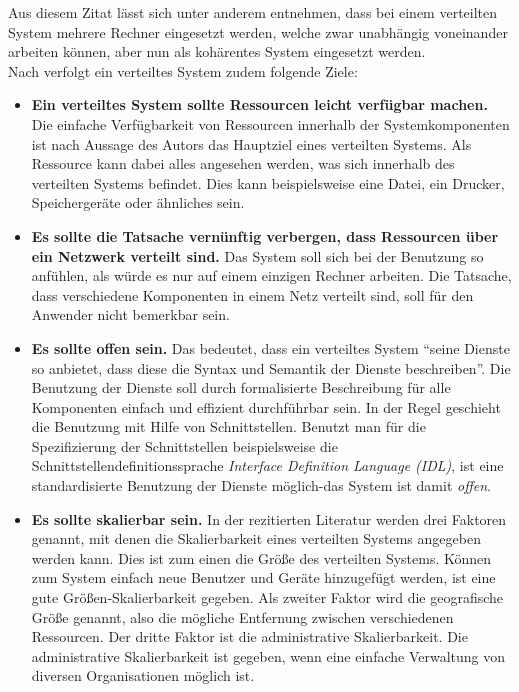 Aus diesem Zitat lässt sich unter anderem entnehmen, dass bei einem verteilten System mehrere Rechner eingesetzt werden, welche zwar unabhängig voneinander arbeiten können, aber nun als kohärentes System eingesetzt werden. \\
Nach \citep{tanenbaum} verfolgt ein verteiltes System zudem folgende Ziele: 
\begin{itemize}
	\item \textbf{Ein verteiltes System sollte Ressourcen leicht verfügbar machen.}
	Die einfache Verfügbarkeit von Ressourcen innerhalb der Systemkomponenten ist nach Aussage des Autors das Hauptziel eines verteilten Systems. Als Ressource kann dabei alles angesehen werden, was sich innerhalb des verteilten Systems befindet. Dies kann beispielsweise eine Datei, ein Drucker, Speichergeräte oder ähnliches sein. 
	\item \textbf{Es sollte die Tatsache vernünftig verbergen, dass Ressourcen über ein Netzwerk verteilt sind.}
	Das System soll sich bei der Benutzung so anfühlen, als würde es nur auf einem einzigen Rechner arbeiten. Die Tatsache, dass verschiedene Komponenten in einem Netz verteilt sind, soll für den Anwender nicht bemerkbar sein.
	\item \textbf{Es sollte offen sein.}
	Das bedeutet, dass ein verteiltes System \enquote{seine Dienste so anbietet, dass diese die Syntax und Semantik der Dienste beschreiben}. Die Benutzung der Dienste soll durch formalisierte Beschreibung für alle Komponenten einfach und effizient durchführbar sein. In der Regel geschieht die Benutzung mit Hilfe von Schnittstellen. Benutzt man für die Spezifizierung der Schnittstellen beispielsweise die Schnittstellendefinitionssprache \emph{Interface Definition Language (IDL)}, ist eine standardisierte Benutzung der Dienste möglich-das System ist damit \emph{offen}.
	\item \textbf{Es sollte skalierbar sein.}
In der rezitierten Literatur werden drei Faktoren genannt, mit denen die Skalierbarkeit eines verteilten Systems angegeben werden kann. Dies ist zum einen die Größe des verteilten Systems. Können zum System einfach neue Benutzer und Geräte hinzugefügt werden, ist eine gute Größen-Skalierbarkeit gegeben. Als zweiter Faktor wird die geografische Größe genannt, also die mögliche Entfernung zwischen verschiedenen Ressourcen. Der dritte Faktor ist die administrative Skalierbarkeit. Die administrative Skalierbarkeit ist gegeben, wenn eine einfache Verwaltung von diversen Organisationen möglich ist. 
\end{itemize}

